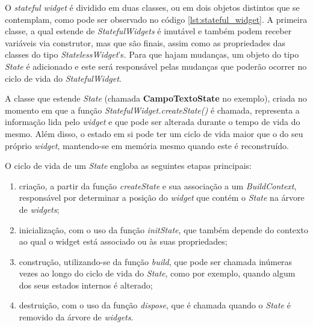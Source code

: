 O \textit{stateful widget} é dividido em duas classes, ou em dois objetos distintos que se contemplam, como pode ser observado no código \ref{lst:stateful_widget}.
A primeira classe, a qual estende de \textit{StatefulWidgets} é imutável e também podem receber variáveis via construtor, mas que são finais, assim como as propriedades das classes do tipo \textit{StatelessWidget}'s. Para que hajam mudanças, um objeto do tipo \textit{State} é adicionado e este será responsável pelas mudanças que poderão ocorrer no ciclo de vida do \textit{StatefulWidget}.

A classe que estende \textit{State} (chamada \textbf{CampoTextoState} no exemplo), criada no momento em que a função \textit{StatefulWidget.createState()} é chamada, representa a informação lida pelo \textit{widget} e que pode ser alterada durante o tempo de vida do mesmo.
Além disso, o estado em si pode ter um ciclo de vida maior que o do seu próprio \textit{widget}, mantendo-se em memória mesmo quando este é reconstruído.

O ciclo de vida de um \textit{State} engloba as seguintes etapas principais:

\begin{enumerate}
  \item criação, a partir da função \textit{createState} e sua associação a um \textit{BuildContext}, responsável por determinar a posição do \textit{widget} que contém o \textit{State} na árvore de \textit{widgets};
  \item inicialização, com o uso da função \textit{initState}, que também depende do contexto ao qual o widget está associado ou às suas propriedades;
  \item construção, utilizando-se da função \textit{build}, que pode ser chamada inúmeras vezes ao longo do ciclo de vida do \textit{State}, como por exemplo, quando algum dos seus estados internos é alterado;
  \item destruição, com o uso da função \textit{dispose}, que é chamada quando o \textit{State} é removido da árvore de \textit{widgets}.
\end{enumerate}

